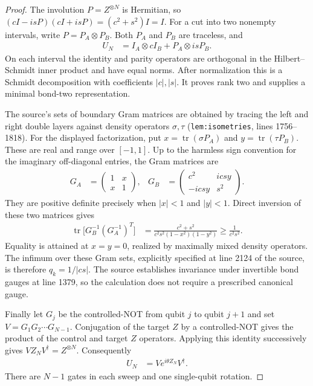\documentclass[11pt]{article}
\begin{document}
\begin{proof}
The involution $P=Z^{\otimes N}$ is Hermitian, so
$(cI-isP)(cI+isP)=(c^2+s^2)I=I$. For a cut into two nonempty intervals,
write $P=P_A\otimes P_B$. Both $P_A$ and $P_B$ are traceless, and
\begin{align}
 U_N&=I_A\otimes cI_B+P_A\otimes isP_B.
\end{align}
On each interval the identity and parity operators are orthogonal in the
Hilbert--Schmidt inner product and have equal norms. After normalization
this is a Schmidt decomposition with coefficients $|c|,|s|$. It proves
rank two and supplies a minimal bond-two representation.

The source's sets of boundary Gram matrices are obtained by tracing the
left and right double layers against density operators $\sigma,\tau$
(\texttt{lem:isometries}, lines 1756--1818). For the displayed factorization,
put $x=\operatorname{tr}(\sigma P_A)$ and
$y=\operatorname{tr}(\tau P_B)$. These are real and range over $[-1,1]$.
Up to the harmless sign convention for the imaginary off-diagonal entries,
the Gram matrices are
\begin{align}
 G_A&=\begin{pmatrix}1&x\\x&1\end{pmatrix},&
 G_B&=\begin{pmatrix}c^2&icsy\\-icsy&s^2\end{pmatrix}.
 \label{eq:parity-grams}
\end{align}
They are positive definite precisely when $|x|<1$ and $|y|<1$.
Direct inversion of these two matrices gives
\begin{align}
 \operatorname{tr}\bigl[G_B^{-1}(G_A^{-1})^T\bigr]
 &=\frac{c^2+s^2}{c^2s^2(1-x^2)(1-y^2)}
 \geq\frac{1}{c^2s^2}.
 \label{eq:parity-gram-inverse}
\end{align}
Equality is attained at $x=y=0$, realized by maximally mixed density
operators. The infimum over these Gram sets, explicitly specified at line
2124 of the source, is therefore $q_k=1/|cs|$. The source
establishes invariance under invertible bond gauges at line 1379,
so the calculation does not require a prescribed canonical gauge.

Finally let $G_j$ be the controlled-NOT from qubit $j$ to qubit $j+1$ and
set $V=G_1G_2\cdots G_{N-1}$. Conjugation of the target $Z$ by a
controlled-NOT gives the product of the control and target $Z$ operators.
Applying this identity successively gives $VZ_NV^\dagger=Z^{\otimes N}$.
Consequently
\begin{align}
 U_N&=V e^{i\theta Z_N}V^\dagger.
\end{align}
There are $N-1$ gates in each sweep and one single-qubit rotation.
\end{proof}
\end{document}
